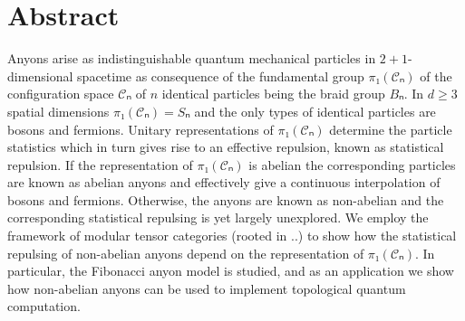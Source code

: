 
\chapter*{Abstract}

Anyons arise as indistinguishable quantum mechanical particles in $2+1$-dimensional spacetime as consequence of the fundamental group $π₁(𝒞ₙ)$ of the configuration space $𝒞ₙ$ of $n$ identical particles being the braid group $Bₙ$. In $d≥3$ spatial dimensions $π₁(𝒞ₙ) = Sₙ$ and the only types of identical particles are bosons and fermions. Unitary representations of $π₁(𝒞ₙ)$ determine the particle statistics which in turn gives rise to an effective repulsion, known as statistical repulsion. If the representation of $π₁(𝒞ₙ)$ is abelian the corresponding particles are known as abelian anyons and effectively give a continuous interpolation of bosons and fermions. Otherwise, the anyons are known as non-abelian and the corresponding statistical repulsing is yet largely unexplored. We employ the framework of modular tensor categories (rooted in ..) to show how the statistical repulsing of non-abelian anyons depend on the representation of $π₁(𝒞ₙ)$. In particular, the Fibonacci anyon model is studied, and as an application we show how non-abelian anyons can be used to implement topological quantum computation.


